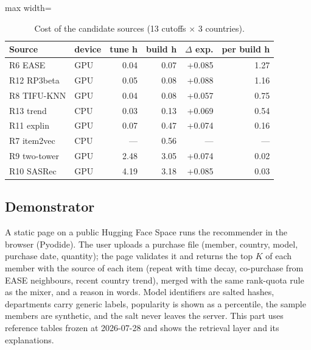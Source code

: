\documentclass{ieeeaccess}
\begin{document}
\begin{table}[t]
\caption{Cost of the candidate sources (13 cutoffs $\times$ 3 countries).}
\label{tab:cost}
\setlength{\tabcolsep}{3pt}
\centering
\begin{adjustbox}{max width=\columnwidth}
\begin{tabular}{llrrrr}
\toprule
Source & device & tune h & build h & $\Delta$ exp. & per build h \\
\midrule
R6 EASE       & GPU & 0.04 & 0.07 & +0.085 & 1.27 \\
R12 RP3beta   & GPU & 0.05 & 0.08 & +0.088 & 1.16 \\
R8 TIFU-KNN   & GPU & 0.04 & 0.08 & +0.057 & 0.75 \\
R13 trend     & CPU & 0.03 & 0.13 & +0.069 & 0.54 \\
R11 explin    & GPU & 0.07 & 0.47 & +0.074 & 0.16 \\
R7 item2vec   & CPU & ---  & 0.56 & ---    & --- \\
R9 two-tower  & GPU & 2.48 & 3.05 & +0.074 & 0.02 \\
R10 SASRec    & GPU & 4.19 & 3.18 & +0.085 & 0.03 \\
\bottomrule
\end{tabular}
\end{adjustbox}
\end{table}

\subsection{Demonstrator}
A static page on a public Hugging Face Space runs the recommender in the browser (Pyodide). The user uploads a purchase file
(member, country, model, purchase date, quantity); the page validates it and returns the top $K$ of each member with the source of
each item (repeat with time decay, co-purchase from EASE neighbours, recent country trend), merged with the same rank-quota rule as
the mixer, and a reason in words. Model identifiers are salted hashes, departments carry generic labels, popularity is shown as a
percentile, the sample members are synthetic, and the salt never leaves the server. This part uses reference tables frozen at
2026-07-28 and shows the retrieval layer and its explanations.
\end{document}

